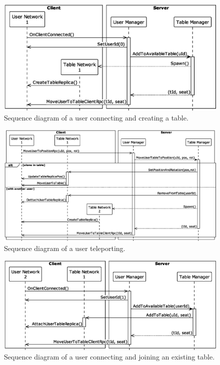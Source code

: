         \begin{figure}[h]
            \centering
            \includegraphics[width=.9\linewidth]{diagrams/out/connect_and_create_table.eps}
            \caption{Sequence diagram of a user connecting and creating a table.}
            \label{fig:connect_and_create}
        \end{figure}

        \begin{figure}[h]
            \centering
            \includegraphics[width=.9\linewidth]{diagrams/out/teleport.eps}
            \caption{Sequence diagram of a user teleporting.}
            \label{fig:teleport}
        \end{figure}

        \begin{figure}[h]
            \centering
            \includegraphics[width=.9\linewidth]{diagrams/out/connect_and_join_existing_table.eps}
            \caption{Sequence diagram of a user connecting and joining an existing table.}
            \label{fig:connect_and_join}
        \end{figure}


